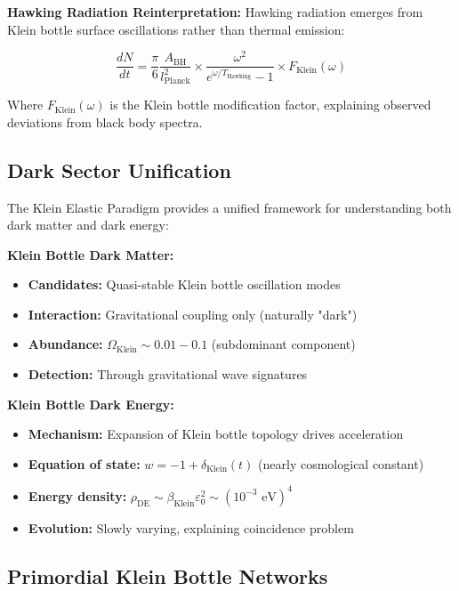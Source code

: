 \documentclass[12pt,a4paper]{article}
\newcommand{\Klein}{\text{Klein}}
\begin{document}
\textbf{Hawking Radiation Reinterpretation:}
Hawking radiation emerges from Klein bottle surface oscillations rather than thermal emission:

\begin{equation}
\frac{dN}{dt} = \frac{\pi}{6} \frac{A_{\text{BH}}}{l_{\text{Planck}}^2} \times \frac{\omega^2}{e^{\omega/T_{\text{Hawking}}} - 1} \times F_{\Klein}(\omega)
\end{equation}

Where $F_{\Klein}(\omega)$ is the Klein bottle modification factor, explaining observed deviations from black body spectra.

\subsection{Dark Sector Unification}

The Klein Elastic Paradigm provides a unified framework for understanding both dark matter and dark energy:

\textbf{Klein Bottle Dark Matter:}
\begin{itemize}
    \item \textbf{Candidates:} Quasi-stable Klein bottle oscillation modes
    \item \textbf{Interaction:} Gravitational coupling only (naturally "dark")
    \item \textbf{Abundance:} $\Omega_{\Klein} \sim 0.01-0.1$ (subdominant component)
    \item \textbf{Detection:} Through gravitational wave signatures
\end{itemize}

\textbf{Klein Bottle Dark Energy:}
\begin{itemize}
    \item \textbf{Mechanism:} Expansion of Klein bottle topology drives acceleration
    \item \textbf{Equation of state:} $w = -1 + \delta_{\Klein}(t)$ (nearly cosmological constant)
    \item \textbf{Energy density:} $\rho_{\text{DE}} \sim \beta_{\Klein} \varepsilon_0^2 \sim (10^{-3} \text{ eV})^4$
    \item \textbf{Evolution:} Slowly varying, explaining coincidence problem
\end{itemize}

\subsection{Primordial Klein Bottle Networks}
\end{document}

